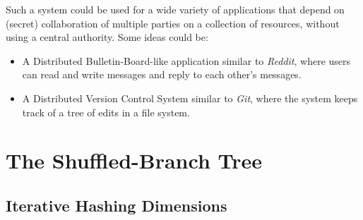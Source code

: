\documentclass[a4paper]{article}
\begin{document}
Such a system could be used for a wide variety of applications that depend on (secret) collaboration of multiple parties on a collection of resources, without using a central authority. Some ideas could be:
\begin{itemize}
	\item A Distributed Bulletin-Board-like application similar to \textit{Reddit}, where users can read and write messages and reply to each other's messages.
	\item A Distributed Version Control System similar to \textit{Git}, where the system keeps track of a tree of edits in a file system.
\end{itemize}



\section{The Shuffled-Branch Tree}





\subsection{Iterative Hashing Dimensions}
\end{document}
